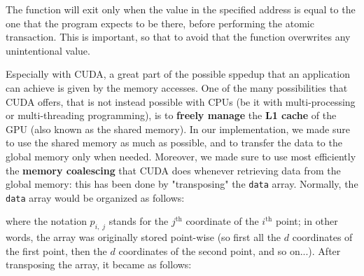 \documentclass[11pt, journal]{IEEEtran}
\newcommand{\nwl}{

\vspace{11pt}

}
\begin{document}
The function will exit only when the value in the specified address is equal to the one that the program expects to be there, before performing the atomic transaction. This is important, so that to avoid that the function overwrites any unintentional value.
\nwl
Especially with CUDA, a great part of the possible sppedup that an application can achieve is given by the memory accesses. One of the many possibilities that CUDA offers, that is not instead possible with CPUs (be it with multi-processing or multi-threading programming), is to \textbf{freely manage} the \textbf{L1 cache} of the GPU (also known as the shared memory). In our implementation, we made sure to use the shared memory as much as possible, and to transfer the data to the global memory only when needed. Moreover, we made sure to use most efficiently the \textbf{memory coalescing} that CUDA does whenever retrieving data from the global memory: this has been done by "transposing" the \verb|data| array. Normally, the \verb|data| array would be organized as follows:

\begin{center}
\end{center}

\nwl
where the notation $p_{i, \; j}$ stands for the $j^{\text{th}}$ coordinate of the $i^{\text{th}}$ point; in other words, the array was originally stored point-wise (so first all the $d$ coordinates of the first point, then the $d$ coordinates of the second point, and so on...). After transposing the array, it became as follows:
\end{document}
